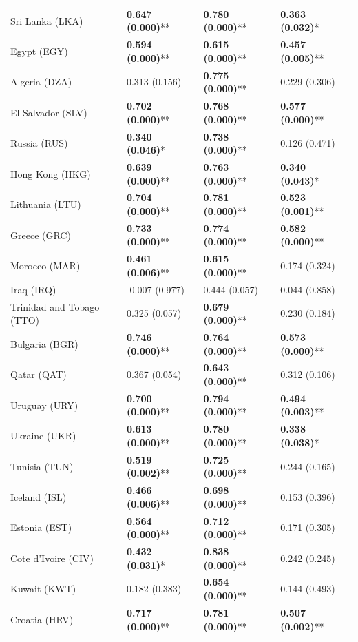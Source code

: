\begin{longtable}{p{4cm}p{3cm}p{3cm}p{3cm}}
Sri Lanka (LKA) & \textbf{0.647 (0.000)}** & \textbf{0.780 (0.000)}** & \textbf{0.363 (0.032)}* \\
Egypt (EGY) & \textbf{0.594 (0.000)}** & \textbf{0.615 (0.000)}** & \textbf{0.457 (0.005)}** \\
Algeria (DZA) & 0.313 (0.156) & \textbf{0.775 (0.000)}** & 0.229 (0.306) \\
El Salvador (SLV) & \textbf{0.702 (0.000)}** & \textbf{0.768 (0.000)}** & \textbf{0.577 (0.000)}** \\
Russia (RUS) & \textbf{0.340 (0.046)}* & \textbf{0.738 (0.000)}** & 0.126 (0.471) \\
Hong Kong (HKG) & \textbf{0.639 (0.000)}** & \textbf{0.763 (0.000)}** & \textbf{0.340 (0.043)}* \\
Lithuania (LTU) & \textbf{0.704 (0.000)}** & \textbf{0.781 (0.000)}** & \textbf{0.523 (0.001)}** \\
Greece (GRC) & \textbf{0.733 (0.000)}** & \textbf{0.774 (0.000)}** & \textbf{0.582 (0.000)}** \\
Morocco (MAR) & \textbf{0.461 (0.006)}** & \textbf{0.615 (0.000)}** & 0.174 (0.324) \\
Iraq (IRQ) & -0.007 (0.977) & 0.444 (0.057) & 0.044 (0.858) \\
Trinidad and Tobago (TTO) & 0.325 (0.057) & \textbf{0.679 (0.000)}** & 0.230 (0.184) \\
Bulgaria (BGR) & \textbf{0.746 (0.000)}** & \textbf{0.764 (0.000)}** & \textbf{0.573 (0.000)}** \\
Qatar (QAT) & 0.367 (0.054) & \textbf{0.643 (0.000)}** & 0.312 (0.106) \\
Uruguay (URY) & \textbf{0.700 (0.000)}** & \textbf{0.794 (0.000)}** & \textbf{0.494 (0.003)}** \\
Ukraine (UKR) & \textbf{0.613 (0.000)}** & \textbf{0.780 (0.000)}** & \textbf{0.338 (0.038)}* \\
Tunisia (TUN) & \textbf{0.519 (0.002)}** & \textbf{0.725 (0.000)}** & 0.244 (0.165) \\
Iceland (ISL) & \textbf{0.466 (0.006)}** & \textbf{0.698 (0.000)}** & 0.153 (0.396) \\
Estonia (EST) & \textbf{0.564 (0.000)}** & \textbf{0.712 (0.000)}** & 0.171 (0.305) \\
Cote d'Ivoire (CIV) & \textbf{0.432 (0.031)}* & \textbf{0.838 (0.000)}** & 0.242 (0.245) \\
Kuwait (KWT) & 0.182 (0.383) & \textbf{0.654 (0.000)}** & 0.144 (0.493) \\
Croatia (HRV) & \textbf{0.717 (0.000)}** & \textbf{0.781 (0.000)}** & \textbf{0.507 (0.002)}** \\

\end{longtable}
